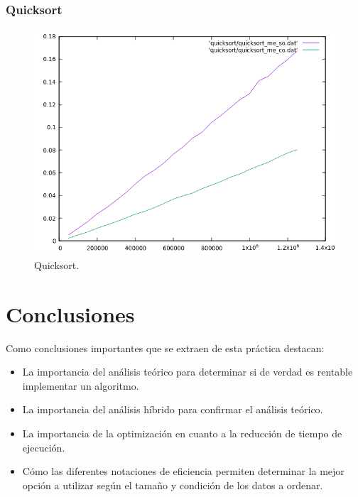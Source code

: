 \documentclass[a4paper,12pt,twoside]{article} %
\begin{document}
\newpage

	\subsubsection{Quicksort}

\begin{figure}[h]
  \begin{center}
  
  	\includegraphics[scale=0.8]{comparacion_qq.png}
  	\caption{Quicksort.}
  	
  \end{center}
\end{figure}

	
\newpage


\section{Conclusiones}

Como conclusiones importantes que se extraen de esta práctica destacan:

\begin{itemize}
	\item La importancia del análisis teórico para determinar si de verdad es rentable implementar un algoritmo.
	\item La importancia del análisis híbrido para confirmar el análisis teórico.
	\item La importancia de la optimización en cuanto a la reducción de tiempo de ejecución.
	\item Cómo las diferentes notaciones de eficiencia permiten determinar la mejor opción a utilizar según el tamaño y condición de los datos a ordenar.
\end{itemize}
\end{document}
